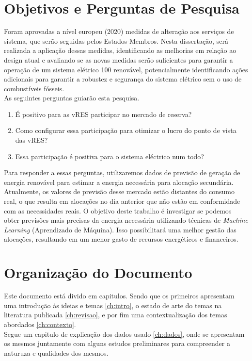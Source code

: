 \section{Objetivos e Perguntas de Pesquisa\label{se:objetivos}}

Foram aprovadas a nível europeu (2020) medidas de alteração aos serviços de sistema, que serão seguidas pelos Estados-Membros. Nesta dissertação, será realizada a aplicação dessas medidas, identificando as melhorias em relação ao design atual e avaliando se as novas medidas serão suficientes para garantir a operação de um sistema elétrico 100 renovável, potencialmente identificando ações adicionais para garantir a robustez e segurança do sistema elétrico sem o uso de combustíveis fósseis. \\

As seguintes perguntas guiarão esta pesquisa.\\

\begin{enumerate}[label=\alph*)]
  \item É positivo para as vRES participar no mercado de reserva?
  \item Como configurar essa participação para otimizar o lucro do ponto de vista das vRES?
  \item Essa participação é positiva para o sistema eléctrico num todo?
\end{enumerate}

Para responder a essas perguntas, utilizaremos dados de previsão de geração de energia renovável para estimar a energia necessária para alocação secundária. Atualmente, os valores de previsão desse mercado estão distantes do consumo real, o que resulta em alocações no dia anterior que não estão em conformidade com as necessidades reais. O objetivo deste trabalho é investigar se podemos obter previsões mais precisas da energia necessária utilizando técnicas de \textit{Machine Learning} (Aprendizado de Máquina). Isso possibilitará uma melhor gestão das alocações, resultando em um menor gasto de recursos energéticos e financeiros.

\section{Organização do Documento \label{se:organização}}

Este documento está divido em capitulos. Sendo que os primeiros apresentam uma introdução às ideias e temas \ref{ch:intro}, o estado de arte do temas na literatura publicada \ref{ch:revisao}, e por fim uma contextualização dos temas abordados \ref{ch:contexto}. \\
Segue um capitulo de explicação dos dados usado \ref{ch:dados}, onde se apresentam os mesmos juntamente com alguns estudos preliminares para compreender a naturuza e qualidades dos mesmos. \\

